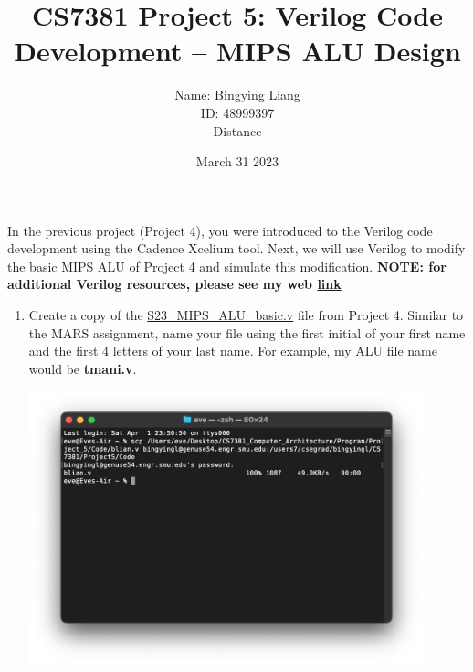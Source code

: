 \documentclass[12pt]{article}
\title{CS7381 Project 5: Verilog Code Development – MIPS ALU Design }
\author{
Name: Bingying Liang \\
ID: 48999397\\  
Distance}
\date{March 31 2023}
\begin{document}
\maketitle
\noindent In the previous project (Project 4), you were introduced to the Verilog code development using the Cadence Xcelium tool. Next, we will use Verilog to modify the basic MIPS ALU of Project 4 and simulate this modification. \textbf{NOTE: for additional Verilog resources, please see my web \href{https://s2.smu.edu/~manikas/CAD_Tools/Verilog/Xcelium.htmlLinks to an external site.}{link}}

\begin{enumerate}
    \item Create a copy of the \href{https://smu.instructure.com/courses/106177/files/7251184?wrap=1}{S23\_MIPS\_ALU\_basic.v} file from Project 4. Similar to the MARS assignment, name your file using the first initial of your first name and the first 4 letters of your last name. For example, my ALU file name would be \textbf{tmani.v}.
    \begin{center}
        \includegraphics[width=0.9\textwidth]{p1.png}
    \end{center}
    

\end{enumerate}
\end{document}
